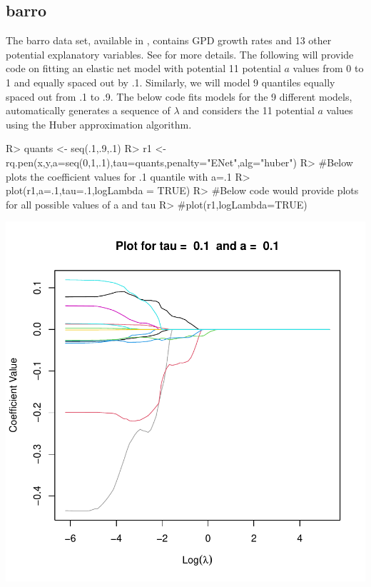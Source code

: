 \documentclass[article]{rqPenVignette}%
\begin{document}
\subsection{barro}

The barro data set, available in , contains GPD growth rates and 13 other potential explanatory variables. See \citet{barro} for more details. The following will provide code on fitting an elastic net model with potential 11 potential $a$ values from 0 to 1 and equally spaced out by .1. Similarly, we will model 9 quantiles equally spaced out from .1 to .9. The below code fits models for the 9 different models, automatically generates a sequence of $\lambda$ and considers the 11 potential $a$ values using the Huber approximation algorithm. 
\begin{Schunk}
\begin{Sinput}
R> quants <- seq(.1,.9,.1)
R> r1 <- rq.pen(x,y,a=seq(0,1,.1),tau=quants,penalty="ENet",alg="huber")
R> #Below plots the coefficient values for .1 quantile with a=.1
R> plot(r1,a=.1,tau=.1,logLambda = TRUE)
R> #Below code would provide plots for all possible values of a and tau
R> #plot(r1,logLambda=TRUE)
\end{Sinput}
\end{Schunk}
\includegraphics{article-006}
\end{document}
